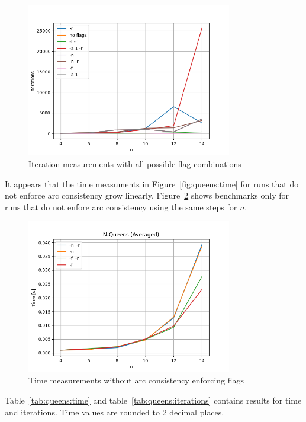 \begin{figure}[ht]
	\centering
	\includegraphics[width=0.8\textwidth]{./Problems/queens/plots/iterations.png}
	\caption{Iteration measurements with all possible flag combinations}
	\label{fig:queens:iterations}
\end{figure}

It appears that the time measuments in Figure~\ref{fig:queens:time} for runs that do not enforce arc consistency grow linearly. Figure~\ref{fig:queens:time_no_arc} shows benchmarks only for runs that do not enfore arc consistency using the same steps for $n$.

\begin{figure}[ht]
	\centering
	\includegraphics[width=0.8\textwidth]{./Problems/queens/plots/time_no_arc.png}
	\caption{Time measurements without arc consistency enforcing flags}
	\label{fig:queens:time_no_arc}
\end{figure}

Table~\ref{tab:queens:time} and table~\ref{tab:queens:iterations} contains results for time and iterations. Time values are rounded to 2 decimal places.


